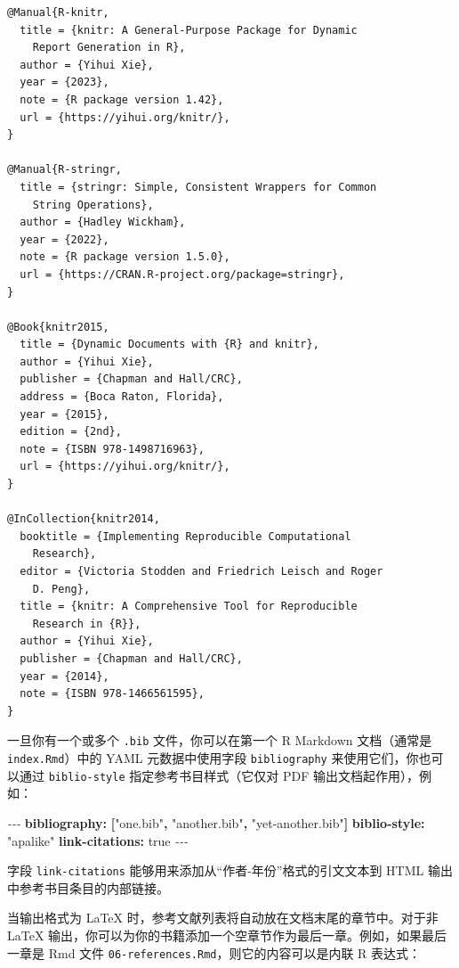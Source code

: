 \documentclass[
  12pt,
]{krantz}
\newenvironment{Shaded}{\begin{snugshade}}{\end{snugshade}}
\newcommand{\AttributeTok}[1]{\textcolor[rgb]{0.13,0.29,0.53}{#1}}
\newcommand{\CharTok}[1]{\textcolor[rgb]{0.31,0.60,0.02}{#1}}
\newcommand{\FunctionTok}[1]{\textcolor[rgb]{0.13,0.29,0.53}{\textbf{#1}}}
\newcommand{\KeywordTok}[1]{\textcolor[rgb]{0.13,0.29,0.53}{\textbf{#1}}}
\newcommand{\PreprocessorTok}[1]{\textcolor[rgb]{0.56,0.35,0.01}{\textit{#1}}}
\newcommand{\StringTok}[1]{\textcolor[rgb]{0.31,0.60,0.02}{#1}}
\theoremstyle{definition}
\theoremstyle{definition}
\theoremstyle{definition}
\theoremstyle{definition}
\theoremstyle{remark}
\begin{document}
\begin{verbatim}
@Manual{R-knitr,
  title = {knitr: A General-Purpose Package for Dynamic
    Report Generation in R},
  author = {Yihui Xie},
  year = {2023},
  note = {R package version 1.42},
  url = {https://yihui.org/knitr/},
}

@Manual{R-stringr,
  title = {stringr: Simple, Consistent Wrappers for Common
    String Operations},
  author = {Hadley Wickham},
  year = {2022},
  note = {R package version 1.5.0},
  url = {https://CRAN.R-project.org/package=stringr},
}

@Book{knitr2015,
  title = {Dynamic Documents with {R} and knitr},
  author = {Yihui Xie},
  publisher = {Chapman and Hall/CRC},
  address = {Boca Raton, Florida},
  year = {2015},
  edition = {2nd},
  note = {ISBN 978-1498716963},
  url = {https://yihui.org/knitr/},
}

@InCollection{knitr2014,
  booktitle = {Implementing Reproducible Computational
    Research},
  editor = {Victoria Stodden and Friedrich Leisch and Roger
    D. Peng},
  title = {knitr: A Comprehensive Tool for Reproducible
    Research in {R}},
  author = {Yihui Xie},
  publisher = {Chapman and Hall/CRC},
  year = {2014},
  note = {ISBN 978-1466561595},
}
\end{verbatim}

一旦你有一个或多个 \texttt{.bib} 文件，你可以在第一个 R Markdown 文档（通常是 \texttt{index.Rmd}）中的 YAML 元数据中使用字段 \texttt{bibliography} 来使用它们，你也可以通过 \texttt{biblio-style} 指定参考书目样式（它仅对 PDF 输出文档起作用），例如：

\begin{Shaded}
\begin{Highlighting}[]
\PreprocessorTok{{-}{-}{-}}
\FunctionTok{bibliography}\KeywordTok{:}\AttributeTok{ }\KeywordTok{[}\StringTok{"one.bib"}\KeywordTok{,}\AttributeTok{ }\StringTok{"another.bib"}\KeywordTok{,}\AttributeTok{ }\StringTok{"yet{-}another.bib"}\KeywordTok{]}
\FunctionTok{biblio{-}style}\KeywordTok{:}\AttributeTok{ }\StringTok{"apalike"}
\FunctionTok{link{-}citations}\KeywordTok{:}\AttributeTok{ }\CharTok{true}
\PreprocessorTok{{-}{-}{-}}
\end{Highlighting}
\end{Shaded}

字段 \texttt{link-citations} 能够用来添加从``作者-年份''格式的引文文本到 HTML 输出中参考书目条目的内部链接。

当输出格式为 LaTeX 时，参考文献列表将自动放在文档末尾的章节中。对于非 LaTeX 输出，你可以为你的书籍添加一个空章节作为最后一章。例如，如果最后一章是 Rmd 文件 \texttt{06-references.Rmd}，则它的内容可以是内联 R 表达式：
\end{document}
